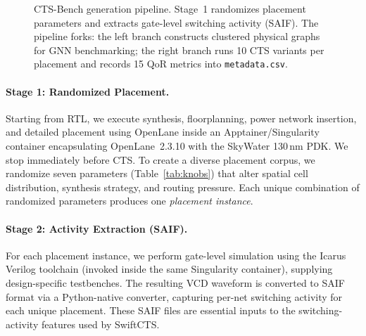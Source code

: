\documentclass[acmsmall,review,anonymous]{acmart}
\begin{document}
\begin{figure}[htbp]
{
}
\caption{CTS-Bench generation pipeline. Stage~1 randomizes placement
  parameters and extracts gate-level switching activity (SAIF). The
  pipeline forks: the left branch constructs clustered physical graphs
  for GNN benchmarking; the right branch runs 10 CTS variants per
  placement and records 15 QoR metrics into \texttt{metadata.csv}.}
\label{fig:pipeline}
\end{figure}

\paragraph{Stage 1: Randomized Placement.}
Starting from RTL, we execute synthesis, floorplanning, power network
insertion, and detailed placement using OpenLane inside an
Apptainer/Singularity container encapsulating OpenLane~2.3.10 with the
SkyWater 130\,nm PDK.
We stop immediately before CTS.
To create a diverse placement corpus, we randomize seven parameters
(Table~\ref{tab:knobs}) that alter spatial cell distribution,
synthesis strategy, and routing pressure. Each unique combination of
randomized parameters produces one \emph{placement instance}.

\paragraph{Stage 2: Activity Extraction (SAIF).}
For each placement instance, we perform gate-level simulation using the
Icarus Verilog toolchain (invoked inside the same Singularity container),
supplying design-specific testbenches. The resulting VCD waveform is
converted to SAIF format via a Python-native converter, capturing
per-net switching activity for each unique placement. These SAIF files are
essential inputs to the switching-activity features used by SwiftCTS.
\end{document}
